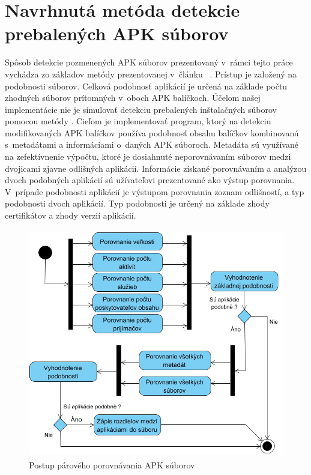 \section{Navrhnutá metóda detekcie prebalených APK súborov}
Spôsob detekcie pozmenených APK súborov prezentovaný v~rámci tejto práce vychádza zo základov metódy prezentovanej v~článku ~\cite{Zhauniarovich2014}. Prístup je založený na podobnosti súborov. Celková podobnosť aplikácií je určená na základe počtu zhodných súborov prítomných v~oboch APK balíčkoch. Účelom našej implementácie nie je simulovať detekciu prebalených inštalačných súborov pomocou metódy . Cieľom je implementovať program, ktorý na detekciu modifikovaných APK balíčkov používa podobnosť obsahu balíčkov kombinovanú s~metadátami a informáciami o~daných APK súboroch. Metadáta sú využívané na zefektívnenie výpočtu, ktoré je dosiahnuté neporovnávaním súborov medzi dvojicami zjavne odlišných aplikácií. Informácie získané porovnávaním a analýzou dvoch podobných aplikácií sú užívateľovi prezentované ako výstup porovnania. V~prípade podobnosti aplikácií je výstupom porovnania zoznam odlišností, a typ podobnosti dvoch aplikácií. Typ podobnosti je určený na základe zhody certifikátov a zhody verzií aplikácií. 
\begin{figure}[htb]
  \begin{center}
    \includegraphics[height=10cm]{images/diagram.jpg}
  \end{center}
  \caption{Postup párového porovnávania APK súborov}
  \label{fig:compareFlow}
\end{figure}
